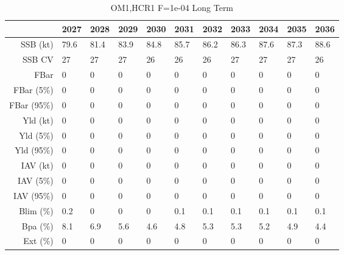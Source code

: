 \begin{table}[ht]
\centering
\begin{tabular}{rllllllllll}
  \hline
 & 2027 & 2028 & 2029 & 2030 & 2031 & 2032 & 2033 & 2034 & 2035 & 2036 \\ 
  \hline
SSB (kt) & 79.6 & 81.4 & 83.9 & 84.8 & 85.7 & 86.2 & 86.3 & 87.6 & 87.3 & 88.6 \\ 
  SSB CV & 27 & 27 & 27 & 26 & 26 & 26 & 27 & 27 & 27 & 26 \\ 
   \hline
FBar & 0 & 0 & 0 & 0 & 0 & 0 & 0 & 0 & 0 & 0 \\ 
  FBar (5\%) & 0 & 0 & 0 & 0 & 0 & 0 & 0 & 0 & 0 & 0 \\ 
  FBar (95\%) & 0 & 0 & 0 & 0 & 0 & 0 & 0 & 0 & 0 & 0 \\ 
   \hline
Yld (kt) & 0 & 0 & 0 & 0 & 0 & 0 & 0 & 0 & 0 & 0 \\ 
  Yld (5\%) & 0 & 0 & 0 & 0 & 0 & 0 & 0 & 0 & 0 & 0 \\ 
  Yld (95\%) & 0 & 0 & 0 & 0 & 0 & 0 & 0 & 0 & 0 & 0 \\ 
   \hline
IAV (kt) & 0 & 0 & 0 & 0 & 0 & 0 & 0 & 0 & 0 & 0 \\ 
  IAV (5\%) & 0 & 0 & 0 & 0 & 0 & 0 & 0 & 0 & 0 & 0 \\ 
  IAV (95\%) & 0 & 0 & 0 & 0 & 0 & 0 & 0 & 0 & 0 & 0 \\ 
   \hline
Blim (\%) & \cellcolor{green}0.2 & \cellcolor{green}0 & \cellcolor{green}0 & \cellcolor{green}0 & \cellcolor{green}0.1 & \cellcolor{green}0.1 & \cellcolor{green}0.1 & \cellcolor{green}0.1 & \cellcolor{green}0.1 & \cellcolor{green}0.1 \\ 
  Bpa (\%) & 8.1 & 6.9 & 5.6 & 4.6 & 4.8 & 5.3 & 5.3 & 5.2 & 4.9 & 4.4 \\ 
  Ext (\%) & 0 & 0 & 0 & 0 & 0 & 0 & 0 & 0 & 0 & 0 \\ 
   \hline
\end{tabular}
\caption{OM1,HCR1 F=1e-04 Long Term} 
\end{table}

